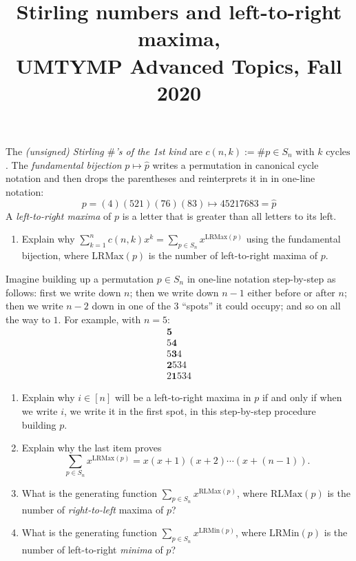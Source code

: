 \documentclass[11pt]{article}
\title{Stirling numbers and left-to-right maxima, \\UMTYMP Advanced Topics, Fall 2020}
\date{}
\begin{document}
\maketitle

\thispagestyle{empty}

The \emph{(unsigned) Stirling $\#$'s of the 1st kind} are $c(n,k) := \textrm{$\# p\in S_n$ with $k$ cycles}$. The \emph{fundamental bijection} $p\mapsto \hat{p}$ writes a permutation in canonical cycle notation and then drops the parentheses and reinterprets it in in one-line notation:
\[ p=(4)(521)(76)(83) \mapsto 45217683=\hat{p} \]
A \emph{left-to-right maxima} of $p$ is a letter that is greater than all letters to its left.


\medskip

\begin{enumerate}

\item Explain why $\sum_{k=1}^{n} c(n,k) x^k = \sum_{p \in S_n} x^{\textrm{LRMax}(p)}$ using the fundamental bijection, where $\textrm{LRMax}(p)$ is the number of left-to-right maxima of $p$.

\end{enumerate}

Imagine building up a permutation $p\in S_n$ in one-line notation step-by-step as follows: first we write down $n$; then we write down $n-1$ either before or after $n$; then we write $n-2$ down in one of the $3$ ``spots'' it could occupy; and so on all the way to $1$. For example, with $n=5$:
\begin{gather*}
\mathbf{5}\\
5\mathbf{4} \\
5\mathbf{3}4 \\
\mathbf{2}534 \\
2\mathbf{1}534
\end{gather*}



\begin{enumerate}
\addtocounter{enumi}{1}
\item Explain why $i\in[n]$ will be a left-to-right maxima in $p$ if and only if when we write $i$, we write it in the first spot, in this step-by-step procedure building $p$.
\item Explain why the last item proves
\[ \sum_{p \in S_n} x^{\textrm{LRMax}(p)} = x(x+1)(x+2)\cdots(x+(n-1)). \]

\medskip

\item What is the generating function $ \sum_{p \in S_n} x^{\textrm{RLMax}(p)}$, where $\textrm{RLMax}(p)$ is the number of \emph{right-to-left} maxima of $p$?
\item What is the generating function $ \sum_{p \in S_n} x^{\textrm{LRMin}(p)}$, where $\textrm{LRMin}(p)$ is the number of left-to-right \emph{minima} of $p$?


\end{enumerate}
\end{document}
